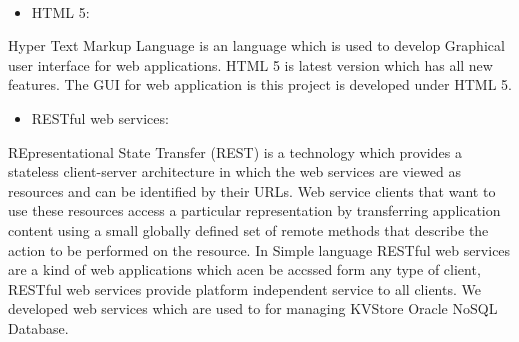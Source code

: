 \\
\begin{itemize}
  \item HTML 5:
\end{itemize}
Hyper Text Markup Language is an language which is used to develop Graphical user interface for web applications. HTML 5 is latest version which has all new features. The GUI for web application is this project is developed under HTML 5.
\\
\begin{itemize}
  \item RESTful web services:
\end{itemize}
REpresentational State Transfer (REST) is a technology which provides a  stateless client-server architecture in which the web services are viewed as resources and can be identified by their URLs. Web service clients that want to use these resources access a particular representation by transferring application content using a small globally defined set of remote methods that describe the action to be performed on the resource. In Simple language RESTful web services are a kind of web applications which acen be accssed form any type of client, RESTful web services provide platform independent service to all clients. We developed web services which are used to for managing KVStore Oracle NoSQL Database.


 
